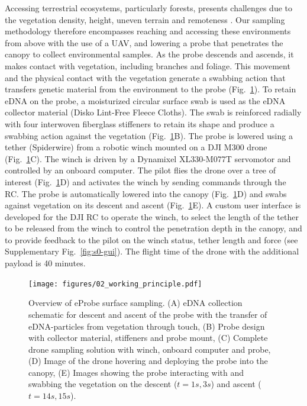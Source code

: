 Accessing terrestrial ecosystems, particularly forests, presents challenges due to the vegetation density, height, uneven terrain and remoteness \cite{Nakamura2017, lowman-2012}. Our sampling methodology therefore encompasses reaching and accessing these environments from above with the use of a UAV, and lowering a probe that penetrates the canopy to collect environmental samples. As the probe descends and ascends, it makes contact with vegetation, including branches and foliage. This movement and the physical contact with the vegetation generate a swabbing action that transfers genetic material from the environment to the probe (Fig.~\ref{fig:2-working-principle}). To retain \gls{eDNA} on the probe, a moisturized circular surface swab is used as the \gls{eDNA} collector material (Disko Lint-Free Fleece Cloths). The swab is reinforced radially with four interwoven fiberglass stiffeners to retain its shape and produce a swabbing action against the vegetation (Fig.~\ref{fig:2-working-principle}B). The probe is lowered using a tether (Spiderwire) from a robotic winch mounted on a DJI M300 drone (Fig.~\ref{fig:2-working-principle}C). The winch is driven by a Dynamixel XL330-M077T servomotor and controlled by an onboard computer. The pilot flies the drone over a tree of interest (Fig.~\ref{fig:2-working-principle}D) and activates the winch by sending commands through the \gls{RC}. The probe is automatically lowered into the canopy (Fig.~\ref{fig:2-working-principle}D) and swabs against vegetation on its descent and ascent (Fig.~\ref{fig:2-working-principle}E). A custom user interface is developed for the DJI RC to operate the winch, to select the length of the tether to be released from the winch to control the penetration depth in the canopy, and to provide feedback to the pilot on the winch status, tether length and force (see Supplementary Fig.~\ref{fig:s0-gui}). The flight time of the drone with the additional payload is 40 minutes.

\begin{figure}[tb]
    \centering
    \texttt{[image: figures/02\_working\_principle.pdf]}
    \caption{Overview of eProbe surface sampling. (A) \gls{eDNA} collection schematic for descent and ascent of the probe with the transfer of \gls{eDNA}-particles from vegetation through touch, (B) Probe design with collector material, stiffeners and probe mount, (C) Complete drone sampling solution with winch, onboard computer and probe, (D) Image of the drone hovering and deploying the probe into the canopy, (E) Images showing the probe interacting with and swabbing the vegetation on the descent ($t=1s,3s$) and ascent ($t=14s,15s$).}
    \label{fig:2-working-principle}
\end{figure}

